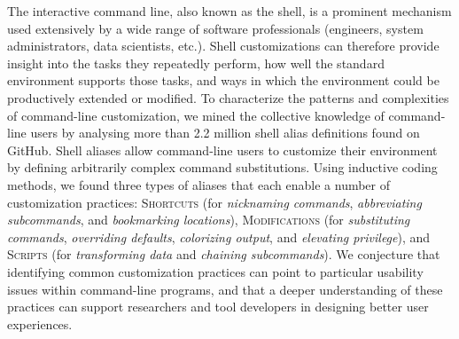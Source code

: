 The interactive command line, also known as the shell, is a prominent mechanism used extensively by a wide range of software professionals (engineers, system administrators, data scientists, etc.). Shell customizations can therefore provide insight into the tasks they repeatedly perform, how well the standard environment supports those tasks, and ways in which the environment could be productively extended or modified.
To characterize the patterns and complexities of command-line customization, we mined the collective knowledge of command-line users by analysing more than 2.2 million shell alias definitions found on GitHub.
Shell aliases allow command-line users to customize their environment by defining arbitrarily complex command substitutions.
Using inductive coding methods, we found three types of aliases that each enable a number of customization practices: 
\textsc{Shortcuts} (for \emph{nicknaming commands}, \emph{abbreviating subcommands}, and \emph{bookmarking locations}),
\textsc{Modifications} (for \emph{substituting commands}, \emph{overriding defaults}, \emph{colorizing output}, and \emph{elevating privilege}),
and \textsc{Scripts} (for \emph{transforming data} and \emph{chaining subcommands}).
We conjecture that identifying common customization practices can point to particular usability issues within command-line programs, and that a deeper understanding of these practices can support researchers and tool developers in designing better user experiences.